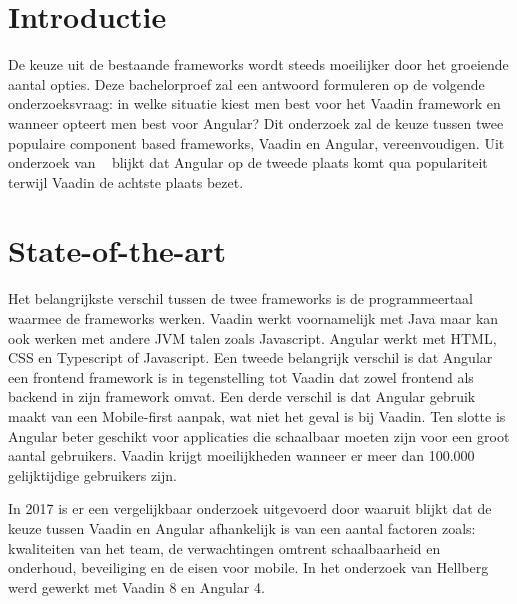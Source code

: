 
\section{Introductie} %
De keuze uit de bestaande frameworks wordt steeds moeilijker door het groeiende aantal opties. Deze bachelorproef zal een antwoord formuleren op de volgende onderzoeksvraag: in welke situatie kiest men best voor het Vaadin framework en wanneer opteert men best voor Angular? Dit onderzoek zal de keuze tussen twee populaire component based frameworks, Vaadin en Angular, vereenvoudigen. Uit onderzoek van ~\textcite{Schlosser2018} blijkt dat Angular op de tweede plaats komt qua populariteit terwijl Vaadin de achtste plaats bezet. 


\section{State-of-the-art}
\label{sec:state-of-the-art}

Het belangrijkste verschil tussen de twee frameworks is de programmeertaal waarmee de frameworks werken. Vaadin werkt voornamelijk met Java maar kan ook werken met andere JVM talen zoals Javascript. Angular werkt met HTML, CSS en Typescript of Javascript.  Een tweede belangrijk verschil is dat Angular een frontend framework is in tegenstelling tot Vaadin dat zowel frontend als backend in zijn framework omvat.
Een derde verschil is dat Angular gebruik maakt van een Mobile-first aanpak, wat niet het geval is bij Vaadin.
Ten slotte is Angular beter geschikt voor applicaties die schaalbaar moeten zijn voor een groot aantal gebruikers. Vaadin krijgt moeilijkheden wanneer er meer dan 100.000 gelijktijdige gebruikers zijn. 

In 2017 is er een vergelijkbaar onderzoek uitgevoerd door \textcite{Hellberg2017} waaruit blijkt dat de keuze tussen Vaadin en Angular afhankelijk is van een aantal factoren zoals: kwaliteiten van het team, de verwachtingen omtrent schaalbaarheid en onderhoud, beveiliging en de eisen voor mobile.
In het onderzoek van Hellberg werd gewerkt met Vaadin 8 en Angular 4.

